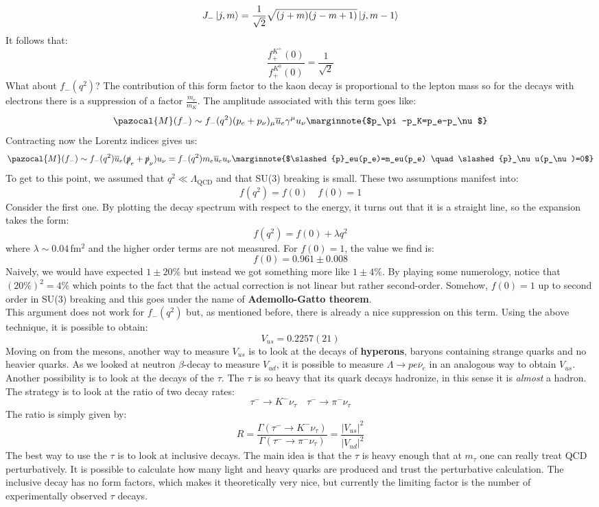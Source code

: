 \documentclass[../main.tex]{subfiles}
\begin{document}
\[
J_-\ket{j,m}=\frac{1}{\sqrt{2}}\sqrt{(j+m)(j-m+1)}\ket{j,m-1}
\]
It follows that:
\[
\frac{f_+^{K^+}(0)}{f_+^{K^0}(0)}=\frac{1}{\sqrt{2}}
\]
What about $f_-(q^2)$? The contribution of this form factor to the kaon decay is proportional to the lepton mass so for the decays with electrons there is a suppression of a factor $\frac{m_e}{m_K}$. The amplitude associated with this term goes like:
\[
\pazocal{M}(f_-)\sim f_-(q^2)(p_e+p_\nu)_\mu\overline{u}_e\gamma^\mu u_\nu\marginnote{$p_\pi-p_K=p_e-p_\nu$}
\]
Contracting now the Lorentz indices gives us:
\[
\pazocal{M}(f_-)\sim f_-(q^2)\overline{u}_e(\slashed{p}_e+\slashed{p}_\nu)u_\nu=f_-(q^2)m_e\overline{u}_eu_\nu\marginnote{$\slashed{p}_eu(p_e)=m_eu(p_e) \quad \slashed{p}_\nu u(p_\nu)=0$}
\]
To get to this point, we assumed that $q^2\ll\Lambda_{\text{QCD}}$ and that SU(3) breaking is small. These two assumptions manifest into:
\[
f(q^2)=f(0) \quad f(0)=1
\]
Consider the first one. By plotting the decay spectrum with respect to the energy, it turns out that it is a straight line, so the expansion takes the form:
\[
f(q^2)=f(0)+\lambda q^2
\]
where $\lambda\sim0.04$\,fm$^2$ and the higher order terms are not measured.  For $f(0)=1$, the value we find is:
\[
f(0)=0.961\pm0.008
\]
Naively, we would have expected $1\pm20\%$ but instead we got something more like $1\pm4\%$. By playing some numerology, notice that $(20\%)^2=4\%$ which points to the fact that the actual correction is not linear but rather second-order. Somehow, $f(0)=1$ up to second order in SU(3) breaking and this goes under the name of \textbf{Ademollo-Gatto theorem}.\\
This argument does not work for $f_-(q^2)$ but, as mentioned before, there is already a nice suppression on this term. Using the above technique, it is possible to obtain:
\[
V_{us}=0.2257(21)
\]
Moving on from the mesons, another way to measure $V_{us}$ is to look at the decays of \textbf{hyperons}, baryons containing strange quarks and no heavier quarks. As we looked at neutron $\beta$-decay to measure $V_{ud}$, it is possible to measure $\Lambda\to pe\overline{\nu}_e$ in an analogous way to obtain $V_{us}$. Another possibility is to look at the decays of the $\tau$. The $\tau$ is so heavy that its quark decays hadronize, in this sense it is \textit{almost} a hadron. The strategy is to look at the ratio of two decay rates:
\[
\tau^-\to K^-\nu_\tau \quad \tau^-\to\pi^-\nu_\tau
\]
The ratio is simply given by:
\[
R=\frac{\Gamma(\tau^-\to K^-\nu_\tau)}{\Gamma(\tau^-\to\pi^-\nu_\tau)}=\frac{|V_{us}|^2}{|V_{ud}|^2}
\]
The best way to use the $\tau$ is to look at inclusive decays. The main idea is that the $\tau$ is heavy
enough that at $m_\tau$ one can really treat QCD perturbatively. It is possible to calculate how
many light and heavy quarks are produced and trust the perturbative calculation. The inclusive
decay has no form factors, which makes it theoretically very nice, but currently the limiting factor
is the number of experimentally observed $\tau$ decays.
\end{document}
